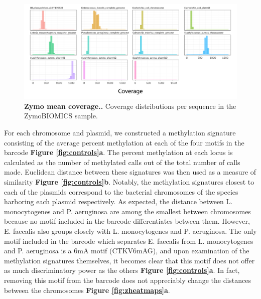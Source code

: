\begin{figure}[!hb]
\centering
\includegraphics[width = 1\linewidth,keepaspectratio]{figure/covhists.pdf}
\caption[Zymo mean coverage.]{{\bf Zymo mean coverage..} Coverage distributions per sequence in the ZymoBIOMICS sample. }
\label{fig:covhists}
\end{figure}


For each chromosome and plasmid, we constructed a methylation signature consisting of the average percent methylation at each of the four motifs in the barcode {\bf Figure \ref{fig:controls}a}. The percent methylation at each locus is calculated as the number of methylated calls out of the total number of calls made. Euclidean distance between these signatures was then used as a measure of similarity {\bf Figure \ref{fig:controls}b}. Notably, the methylation signatures closest to each of the plasmids correspond to the bacterial chromosomes of the species harboring each plasmid respectively. As expected, the distance between L. monocytogenes and P. aeruginosa are among the smallest between chromosomes because no motif included in the barcode differentiates between them. However, E. faecalis also groups closely with L. monocytogenes and P. aeruginosa. The only motif included in the barcode which separates E. faecalis from L. monocytogenes and P. aeruginosa is a 6mA motif (CTKV6mAG), and upon examination of the methylation signatures themselves, it becomes clear that this motif does not offer as much discriminatory power as the others {\bf Figure \ref{fig:controls}a}. In fact, removing this motif from the barcode does not appreciably change the distances between the chromosomes {\bf Figure \ref{fig:zheatmaps}a}.

